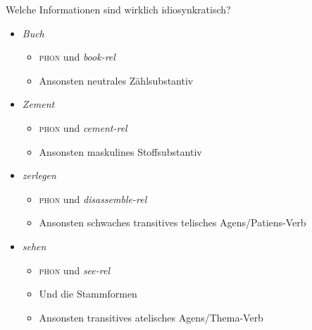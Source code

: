 \begin{frame}
  {Welche Informationen sind wirklich idiosynkratisch?}
  \onslide<+->
  \begin{itemize}[<+->]
    \item \alert{\textit{Buch}}
      \begin{itemize}[<+->]
        \item \textsc{phon} und \textit{book-rel}
        \item Ansonsten \alert{neutrales Zählsubstantiv}
      \end{itemize}
      \Halbzeile
    \item \alert{\textit{Zement}}
      \begin{itemize}[<+->]
        \item \textsc{phon} und \textit{cement-rel}
        \item Ansonsten \alert{maskulines Stoffsubstantiv}
      \end{itemize}
      \Halbzeile
    \item \alert{\textit{zerlegen}}
      \begin{itemize}[<+->]
        \item \textsc{phon} und \textit{disassemble-rel}
        \item Ansonsten \alert{schwaches transitives telisches Agens\slash Patiens-Verb}
      \end{itemize}
      \Halbzeile
    \item \alert{\textit{sehen}}
      \begin{itemize}[<+->]
        \item \textsc{phon} und \textit{see-rel}
        \item Und die \alert{Stammformen}
        \item Ansonsten \alert{transitives atelisches Agens\slash Thema-Verb}
      \end{itemize}
  \end{itemize}
\end{frame}

